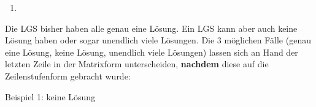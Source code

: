 \begin{Exercise}[title={\raggedright Bestimme die Lösung der folgenden LGS.}, label=LGS_A1]
\begin{minipage}{\textwidth}
{\begin{minipage}{\linewidth/\real{3}}
\begin{enumerate}[label=\alph*)]
                    \bigskip

                    \item {}%
                \end{enumerate}
        \end{minipage}}%
    \end{minipage}
\end{Exercise}
\newpage
Die LGS bisher haben alle genau eine Lösung. Ein LGS kann aber auch keine Lösung haben oder sogar unendlich viele Lösungen. Die 3 möglichen Fälle (genau eine Lösung, keine Lösung, unendlich viele Lösungen) lassen sich an Hand der letzten Zeile in der Matrixform unterscheiden, \textbf{nachdem} diese auf die Zeilenstufenform gebracht wurde:

\smallskip

Beispiel 1: keine Lösung

\medskip

